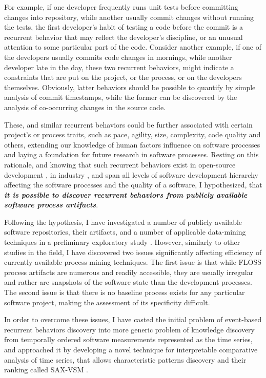For example, if one developer frequently runs unit tests before committing 
changes into repository, while another usually commit changes without running the tests, the first developer's
habit of testing a code before the commit is a recurrent behavior that may reflect the developer's discipline,
or an unusual attention to some particular part of the code. 
Consider another example, if one of the developers usually commits code changes in mornings, while another 
developer late in the day, these two recurrent behaviors, might indicate a constraints that are put on the 
project, or the process, or on the developers themselves.
Obviously, latter behaviors should be possible to quantify by simple analysis of commit timestamps, while 
the former can be discovered by the analysis of co-occurring changes in the source code. 

These, and similar recurrent behaviors could be further associated with certain project's or process 
traits, such as pace, agility, size, complexity, code quality and others, extending our knowledge of human 
factors influence on software processes and laying a foundation for future research in software processes.
Resting on this rationale, and knowing that such recurrent behaviors exist in open-source development 
\cite{citeulike:200721}, in industry \cite{citeulike:5090131}, and span all levels of software development 
hierarchy \cite{citeulike:8347315} affecting the software processes and the quality of a software, 
I hypothesized, that \textbf{\textit{it is possible to discover recurrent behaviors from publicly 
available software process artifacts}}. 

Following the hypothesis, I have investigated a number of publicly available software repositories,
their artifacts, and a number of applicable data-mining techniques in a preliminary exploratory study 
\cite{csdl2-10-09}. However, similarly to other studies in the field, I have discovered two issues 
significantly affecting efficiency of currently available process mining techniques. 
The first issue is that while FLOSS process artifacts are numerous and readily accessible, 
they are usually irregular and rather are snapshots of the software state than the development 
processes. 
The second issue is that there is no baseline process exists for any particular software project,
making the assessment of its specificity difficult.

In order to overcome these issues, I have casted the initial problem of event-based recurrent behaviors 
discovery into more generic problem of knowledge discovery from temporally ordered software measurements 
represented as the time series, and approached it by developing a novel technique for interpretable 
comparative analysis of time series, that allows characteristic patterns discovery and their ranking 
called SAX-VSM \cite{sax-vsm}. 

